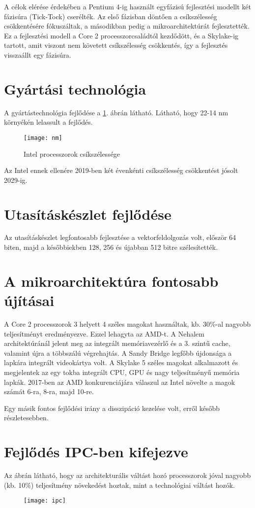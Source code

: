 A célok elérése érdekében a Pentium 4-ig használt egyfázisú fejlesztési modellt két fázisúra (Tick-Tock) cserélték.
Az első fázisban döntően a csíkszélesség csökkentésére fókuszáltak, a másodikban pedig a mikroarchitektúrát fejlesztették.
Ez a fejlesztési modell a Core 2 processzorcsaládtól kezdődött, és a Skylake-ig tartott, amit viszont nem követett csíkszélesség csökkentés, így a fejlesztés visszaállt egy fázisúra.

\section{Gyártási technológia}
A gyártástechnológia fejlődése a \ref{fig:nm}. ábrán látható.
Látható, hogy 22-14 nm környékén lelassult a fejlődés.
\begin{figure}[H]
    \texttt{[image: nm]}
    \centering
    \caption{Intel processzorok csíkszélessége}
    \label{fig:nm}
\end{figure}

Az Intel ennek ellenére 2019-ben két évenkénti csíkszélesség csökkentést jósolt 2029-ig.

\section{Utasításkészlet fejlődése}
Az utasításkészlet legfontosabb fejlesztése a vektorfeldolgozás volt, először 64 biten, majd a későbbiekben 128, 256 és újabban 512 bitre szélesítették.

\section{A mikroarchitektúra fontosabb újításai}
A Core 2 processzorok 3 helyett 4 széles magokat használtak, kb. 30\%-al nagyobb teljesítményt eredményezve.
Ezzel lehagyta az AMD-t.
A Nehalem architektúránál jelent meg az integrált memóriavezérlő és a 3. szintű cache, valamint újra a többszálú végrehajtás.
A Sandy Bridge legfőbb újdonsága a lapkára integrált videokártya volt.
A Skylake 5 széles magokat alkalmazott és megjelentek az egy tokba integrált CPU, GPU és nagy teljesítményű memória lapkák.
2017-ben az AMD konkurenciájára válaszul az Intel növelte a magok számát 6-ra, 8-ra, majd 10-re.

Egy másik fontos fejlődési irány a disszipáció kezelése volt, erről később részletesebben.

\section{Fejlődés IPC-ben kifejezve}
Az ábrán látható, hogy az architekturális váltást hozó processzorok jóval nagyobb (kb. 10\%) teljesítmény növekedést hoztak, mint a technológiai váltást hozók.
\begin{figure}[H]
    \texttt{[image: ipc]}
    \centering
    \label{fig:ipc}
\end{figure}


